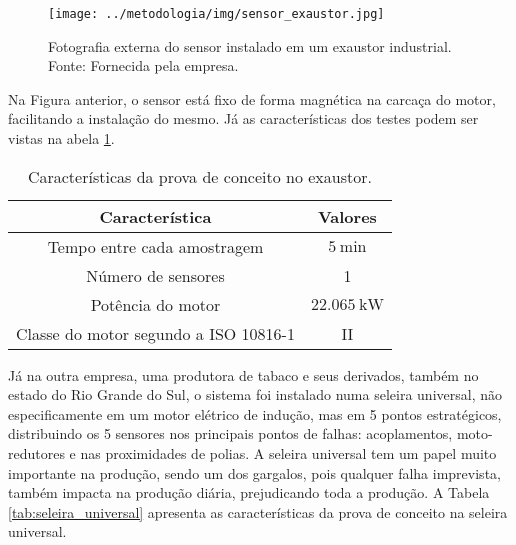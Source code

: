 \documentclass[a4paper]{ifacconf}
\begin{document}
\begin{figure}[h!]
  \begin{center}
      \texttt{[image: ../metodologia/img/sensor\_exaustor.jpg]}
  \end{center}
  \caption{Fotografia externa do sensor instalado em um exaustor industrial. Fonte: Fornecida pela empresa.}
  \label{fig:sensor_exaustor}
\end{figure}

Na Figura anterior, o sensor está fixo de forma magnética na carcaça do motor, facilitando a instalação do mesmo. Já as 
características dos testes podem ser vistas na abela \ref{tab:exautor}. 

\begin{table}[H]
    \caption{Características da prova de conceito no exaustor.}
    \label{tab:exautor}
    \centering%
    \begin{minipage}{.4\textwidth}
      \begin{tabular*}{\textwidth}{c|c}
        \hline
        Característica                          & Valores                                    \\ \hline
        \hline
        Tempo entre cada amostragem             &  $\SI{5}{\minute}$                         \\
        Número de sensores                      &  1                                         \\ 
        Potência do motor                       &  $\SI{22.065}{\kilo\watt}$                      \\
        Classe do motor segundo a  ISO 10816-1  &  II                                         \\
      \end{tabular*} 
    \end{minipage}
  \end{table}


Já na outra empresa, uma produtora de tabaco e seus derivados, também no estado do Rio Grande do Sul, o sistema foi instalado numa 
seleira universal, não especificamente em um motor elétrico de indução, mas em 5 pontos estratégicos, distribuindo os 5 sensores nos principais pontos 
de falhas: acoplamentos, moto-redutores e nas proximidades de polias. A seleira universal tem um papel muito importante na produção, sendo um dos gargalos, pois qualquer falha imprevista, também impacta na produção diária, prejudicando toda a produção. A Tabela \ref{tab:seleira_universal} apresenta 
as características da prova de conceito na seleira universal.
\end{document}
